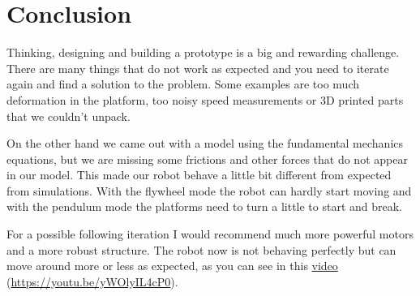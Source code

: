 \section{Conclusion}
Thinking, designing and building a prototype is a big and rewarding challenge.
There are many things that do not work as expected and you need to iterate again
and find a solution to the problem. Some examples are too much deformation in the platform,
too noisy speed measurements or 3D printed parts that we couldn't unpack.

On the other hand we came out with a model using the fundamental mechanics equations, but we are missing
some frictions and other forces that do not appear in our model. This made our robot behave a little bit
different from expected from simulations. With the flywheel mode the robot can hardly start moving and with
the pendulum mode the platforms need to turn a little to start and break.

For a possible following iteration I would recommend much more powerful motors and a more robust structure.
The robot now is not behaving perfectly but can move around more or less as expected, as you can see in this
\href{https://youtu.be/yWOlyIL4cP0}{video} (\href{https://youtu.be/yWOlyIL4cP0}{https://youtu.be/yWOlyIL4cP0}).
